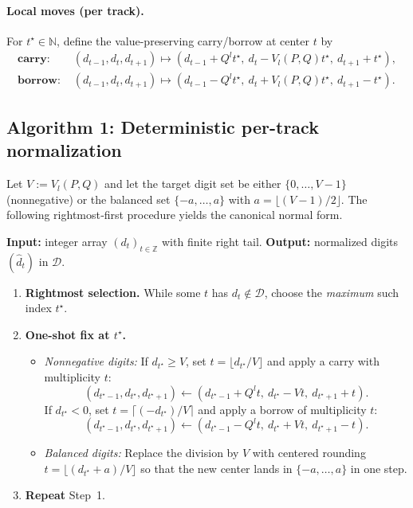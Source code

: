 \documentclass[11pt]{article}
\theoremstyle{definition}
\theoremstyle{remark}
\newcommand{\Z}{\mathbb{Z}}
\newcommand{\N}{\mathbb{N}}
\begin{document}
\paragraph{Local moves (per track).}
For $t^\star\in\N$, define the value-preserving carry/borrow at center $t$ by
\begin{align}
\textbf{carry: }&(d_{t-1},d_t,d_{t+1})\mapsto (d_{t-1}+Q^{l}t^\star,\ d_t-V_l(P,Q)t^\star,\ d_{t+1}+t^\star),\label{eq:carry}\\
\textbf{borrow: }&(d_{t-1},d_t,d_{t+1})\mapsto (d_{t-1}-Q^{l}t^\star,\ d_t+V_l(P,Q)t^\star,\ d_{t+1}-t^\star).\nonumber
\end{align}

\subsection*{Algorithm 1: Deterministic per-track normalization}
Let $V:=V_l(P,Q)$ and let the target digit set be either $\{0,\dots,V-1\}$ (nonnegative) or the balanced set $\{-a,\dots,a\}$ with $a=\lfloor(V-1)/2\rfloor$. The following rightmost‑first procedure yields the canonical normal form.

\medskip
\noindent\textbf{Input:} integer array $(d_t)_{t\in\Z}$ with finite right tail. \quad
\textbf{Output:} normalized digits $(\hat d_t)$ in $\mathcal D$.

\begin{enumerate}
\item \textbf{Rightmost selection.} While some $t$ has $d_t\notin\mathcal D$, choose the \emph{maximum} such index $t^\star$.
\item \textbf{One-shot fix at $t^\star$.}
\begin{itemize}
  \item \emph{Nonnegative digits:} If $d_{t^\star}\ge V$, set $t=\big\lfloor d_{t^\star}/V\big\rfloor$ and apply a carry with multiplicity $t$:
  \[
  (d_{t^\star-1},d_{t^\star},d_{t^\star+1}) \leftarrow (d_{t^\star-1}+Q^l t,\ d_{t^\star}-Vt,\ d_{t^\star+1}+t).
  \]
  If $d_{t^\star}<0$, set $t=\big\lceil(-d_{t^\star})/V\big\rceil$ and apply a borrow of multiplicity $t$:
  \[
  (d_{t^\star-1},d_{t^\star},d_{t^\star+1}) \leftarrow (d_{t^\star-1}-Q^l t,\ d_{t^\star}+Vt,\ d_{t^\star+1}-t).
  \]
  \item \emph{Balanced digits:} Replace the division by $V$ with centered rounding $t=\big\lfloor (d_{t^\star}+a)/V\big\rfloor$ so that the new center lands in $\{-a,\dots,a\}$ in one step.
\end{itemize}
\item \textbf{Repeat} Step~1.
\end{enumerate}
\end{document}
